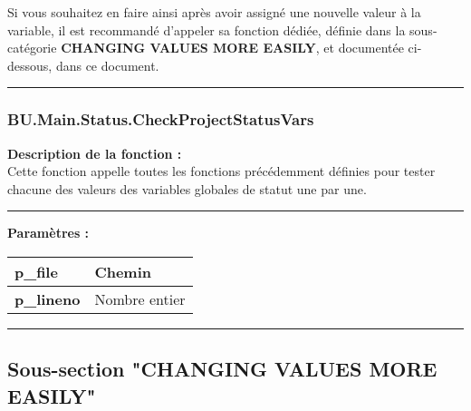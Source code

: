 \documentclass[a4paper,10pt]{article}
\begin{document}
\begin{justify}
    Si vous souhaitez en faire ainsi après avoir assigné une nouvelle valeur à la variable, il est recommandé d'appeler sa fonction dédiée, définie dans la sous-catégorie \textbf{\color{sec2}CHANGING VALUES MORE EASILY}, et documentée ci-dessous, dans ce document.
\end{justify}



\color{sec3}\par\noindent\rule{\textwidth}{0.4pt}\color{text}

\color{sec3}
\subsubsection{BU.Main.Status.CheckProjectStatusVars}\color{text}

\begin{justify}
    \textbf{Description de la fonction :}\\[1\baselineskip]
    Cette fonction appelle toutes les fonctions précédemment définies pour tester chacune des valeurs des variables globales de statut une par une.
\end{justify}


\par\noindent\rule{\textwidth}{0.4pt}

\begin{justify}
    \textbf{Paramètres :}\\[1\baselineskip]
    \begin{tabular}{|l|l|}
        \hline
        \textbf{\color{vars}p\_file} & Chemin\\
        \hline
        \textbf{\color{vars}p\_lineno} & Nombre entier\\
        \hline
    \end{tabular}
\end{justify}

\setlength{\parskip}{2em}




\color{sec2}\par\noindent\rule{\textwidth}{0.4pt}\color{text}

\color{sec2}
\subsection{Sous-section "CHANGING VALUES MORE EASILY"}\color{text}
\end{document}
